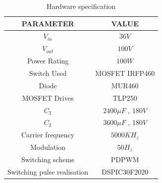 \documentclass[12pt,a4paper]{report}
\begin{document}
\begin{table}[h!]
	\begin{center}
	\begin{tabular}{|c|c|} 
		\hline
		{\bf PARAMETER} & {\bf VALUE} \\  
		\hline
		$V_{in}$ & $36V$ \\ 
		\hline
		$V_{out}$ & $100V$ \\ 
		\hline
		Power Rating & $100W$ \\ 
		\hline
		Switch Used & MOSFET IRFP460 \\ 
		\hline
		Diode & MUR460\\
		\hline
		MOSFET Drives & TLP250 \\ 
		\hline
		$C_2$  & $2400{\mu}F$ , $180V$ \\
		\hline
		$C_2$  & $3600{\mu}F$ , $180V$ \\
		\hline
		Carrier frequency & $5000KH_z$  \\
		\hline
		Modulation & $50H_z$ \\
		\hline
		Switching scheme & PDPWM \\
		\hline
		Switching pulse realisation & DSPIC30F2020\\
		\hline
		\end{tabular}
		\end{center}
	
	\caption{Hardware specification}
	\end{table}
	\vspace{1.0cm}
\end{document}
